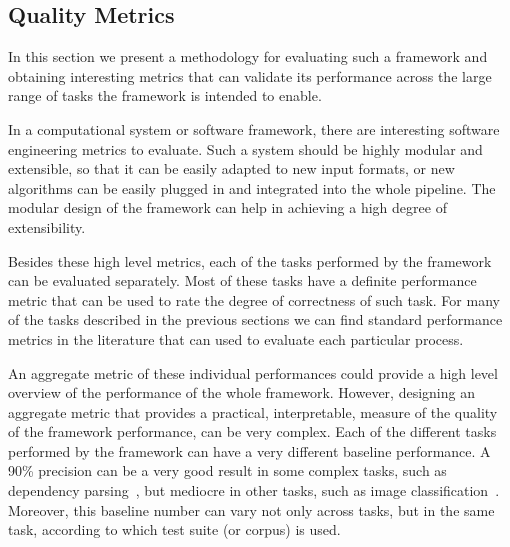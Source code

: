     \subsection{Quality Metrics}\label{sec:evaluation}

    In this section we present a methodology for evaluating such a framework and obtaining interesting metrics that can validate its performance across the large range of tasks the framework is intended to enable.

    In a computational system or software framework, there are interesting software engineering metrics to evaluate. 
    Such a system should be highly modular and extensible, so that it can be easily adapted to new input formats, or new algorithms can be easily plugged in and integrated into the whole pipeline.
    The modular design of the framework can help in achieving a high degree of extensibility.

	  Besides these high level metrics, each of the tasks performed by the framework can be evaluated separately. 
    Most of these tasks have a definite performance metric that can be used to rate the degree of correctness of such task. 
    For many of the tasks described in the previous sections we can find standard performance metrics in the literature that can used to evaluate each particular process.


    An aggregate metric of these individual performances could provide a high level overview of the performance of the whole framework.
    However, designing an aggregate metric that provides a practical, interpretable, measure of the quality of the framework performance, can be very complex.
    Each of the different tasks performed by the framework can have a very different baseline performance. 
    A 90\% precision can be a very good result in some complex tasks, such as dependency parsing~\cite{AlbertiABCGKKMO17}, but mediocre in other tasks, such as image classification~\cite{Russakovsky2015}. 
    Moreover, this baseline number can vary not only across tasks, but in the same task, according to which test suite (or corpus)
    is used.

